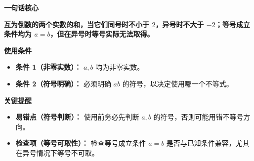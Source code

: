\begin{summarybox}
\textbf{\textcolor{CSummary}{一句话核心}}

\textbf{互为倒数的两个实数的和，当它们同号时不小于 $2$，异号时不大于 $-2$；等号成立条件均为 $a=b$，但在异号时等号实际无法取得。}

\medskip
\textbf{\textcolor{CSummary}{使用条件}}
\begin{itemize}[leftmargin=*, itemsep=0.5em, topsep=0.4em]
    \item \textbf{条件 1（非零实数）：} $a, b$ 均为非零实数。
    \item \textbf{条件 2（符号明确）：} 必须明确 $ab$ 的符号，以决定使用哪一个不等式。
\end{itemize}

\medskip
\textbf{\textcolor{CSummary}{关键提醒}}
\begin{itemize}[leftmargin=*, itemsep=0.5em, topsep=0.4em]
    \item \textbf{易错点（符号判断）：} 使用前务必先判断 $a,b$ 的符号，否则可能用错不等号方向。
    \item \textbf{检查项（等号可取性）：} 检查等号成立条件 $a=b$ 是否与已知条件兼容，尤其在异号情况下等号不可取。
\end{itemize}
\end{summarybox}

